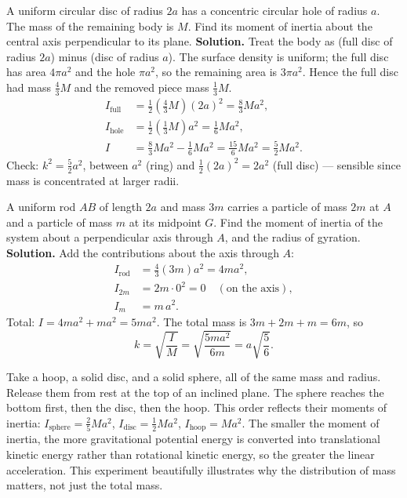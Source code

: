 \documentclass[11pt]{article}
\begin{document}
\begin{exoresolu}
A uniform circular disc of radius $2a$ has a concentric circular hole of radius $a$. The mass of the remaining body is $M$. Find its moment of inertia about the central axis perpendicular to its plane.
\tcblower
\textbf{Solution.} Treat the body as (full disc of radius $2a$) minus (disc of radius $a$). The surface density is uniform; the full disc has area $4\pi a^2$ and the hole $\pi a^2$, so the remaining area is $3\pi a^2$. Hence the full disc had mass $\tfrac43 M$ and the removed piece mass $\tfrac13 M$.
\begin{align*}
I_{\text{full}}&=\tfrac12\left(\tfrac43 M\right)(2a)^2=\tfrac83 Ma^2,\\
I_{\text{hole}}&=\tfrac12\left(\tfrac13 M\right)a^2=\tfrac16 Ma^2,\\
I&=\tfrac83 Ma^2-\tfrac16 Ma^2=\tfrac{15}{6}Ma^2=\boxed{\tfrac52 Ma^2}.
\end{align*}
Check: $k^2=\tfrac52 a^2$, between $a^2$ (ring) and $\tfrac12(2a)^2=2a^2$ (full disc) --- sensible since mass is concentrated at larger radii.
\end{exoresolu}

\begin{exoresolu}
A uniform rod $AB$ of length $2a$ and mass $3m$ carries a particle of mass $2m$ at $A$ and a particle of mass $m$ at its midpoint $G$. Find the moment of inertia of the system about a perpendicular axis through $A$, and the radius of gyration.
\tcblower
\textbf{Solution.} Add the contributions about the axis through $A$:
\begin{align*}
I_{\text{rod}}&=\tfrac43(3m)a^2=4ma^2,\\
I_{2m}&=2m\cdot 0^2=0 \quad(\text{on the axis}),\\
I_{m}&=m\,a^2.
\end{align*}
Total: $I=4ma^2+ma^2=5ma^2$. The total mass is $3m+2m+m=6m$, so
\[ k=\sqrt{\frac{I}{M}}=\sqrt{\frac{5ma^2}{6m}}=a\sqrt{\frac56}. \]
\end{exoresolu}

\begin{experience}
Take a hoop, a solid disc, and a solid sphere, all of the same mass and radius. Release them from rest at the top of an inclined plane. The sphere reaches the bottom first, then the disc, then the hoop. This order reflects their moments of inertia: $I_{\text{sphere}}=\tfrac25 Ma^2$, $I_{\text{disc}}=\tfrac12 Ma^2$, $I_{\text{hoop}}=Ma^2$. The smaller the moment of inertia, the more gravitational potential energy is converted into translational kinetic energy rather than rotational kinetic energy, so the greater the linear acceleration. This experiment beautifully illustrates why the distribution of mass matters, not just the total mass.
\end{experience}
\end{document}
